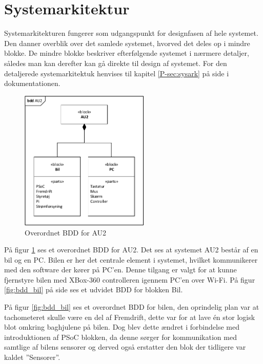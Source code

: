 \section{Systemarkitektur} \label{ch:Systemarkitektur}

Systemarkitekturen fungerer som udgangspunkt for designfasen af hele systemet.
Den danner overblik over det samlede systemet, hvorved det deles op i mindre blokke. 
De mindre blokke beskriver efterfølgende systemet i nærmere detaljer, således man kan derefter kan gå direkte til design af systemet. For den detaljerede systemarkitektuk henvises til kapitel \ref{P-sec:sysark}  på side \pageref{P-sec:sysark} i dokumentationen.

\begin{figure}[h]
\centering
\includegraphics[width=0.55\textwidth]{../fig/diagrammer/bdd_au2.pdf}
\caption{Overordnet BDD for AU2}
\label{fig:bdd_au2}
\end{figure}

På figur \ref{fig:bdd_au2} ses et overordnet BDD for AU2. 
Det ses at systemet AU2 består af en bil og en PC. 
Bilen er her det centrale element i systemet, hvilket kommunikerer med den software der kører på PC'en. 
Denne tilgang er valgt for at kunne fjernstyre bilen med XBox-360 controlleren igennem PC'en over Wi-Fi. På figur \ref{fig:bdd_bil} på side \pageref{fig:bdd_bil} ses et udvidet BDD for blokken Bil.  

På figur \ref{fig:bdd_bil} ses et overordnet BDD for bilen, den oprindelig plan var at tachometeret skulle være en del af Fremdrift, dette var for at lave én stor logisk blot omkring baghjulene på bilen.
Dog blev dette ændret i forbindelse med introduktionen af PSoC blokken, da denne sørger for kommunikation med samtlige af bilens sensorer og derved også erstatter den blok der tidligere var kaldet ''Sensorer''.

